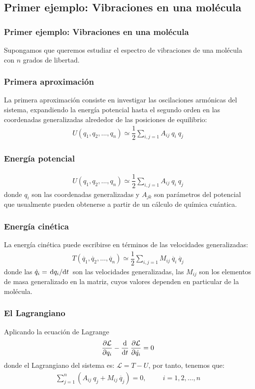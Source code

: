 \subsection{Primer ejemplo: Vibraciones en una molécula}
\begin{frame}
\frametitle{Primer ejemplo: Vibraciones en una molécula}
Supongamos que queremos estudiar el espectro de vibraciones de una molécula con $n$ grados de libertad.
\end{frame}
\begin{frame}
\frametitle{Primera aproximación}
La primera aproximación consiste en investigar las oscilaciones armónicas del sistema, expandiendo la energía potencial hasta el segundo orden en las coordenadas generalizadas alrededor de las posiciones de equilibrio:
\pause
\begin{align*}
U(q_{1}, q_{2}, \ldots, q_{n}) \simeq \dfrac{1}{2} \sum_{i, j = 1} A_{i j} \: q_{i} \: q_{j}
\end{align*}
\end{frame}
\begin{frame}
\frametitle{Energía potencial}
\begin{align*}
U(q_{1}, q_{2}, \ldots, q_{n}) \simeq \dfrac{1}{2} \sum_{i, j = 1} A_{i j} \: q_{i} \: q_{j}
\end{align*}
donde $q_{i}$ son las coordenadas generalizadas y $A_{j k}$ son parámetros del potencial que usualmente pueden obtenerse a partir de un cálculo de química cuántica.
\end{frame}
\begin{frame}
\frametitle{Energía cinética}
La energía cinética puede escribirse en términos de las velocidades generalizadas:
\begin{align*}
T(\dot{q_{1}}, \dot{q_{2}}, \ldots, \dot{q_{n}}) \simeq \dfrac{1}{2} \sum_{i, j=1} M_{i j} \: \dot{q_{i}} \: \dot{q_{j}}
\end{align*}
donde las $\dot{q}_{i}= \dv*{q_{i}}{t}$ son las velocidades generalizadas, las $M_{i j}$ son los elementos de masa generalizado en la matriz, cuyos valores dependen en particular de la molécula. 
\end{frame}
\begin{frame}
\frametitle{El Lagrangiano}
Aplicando la ecuación de Lagrange
\begin{align*}
\pdv{\mathcal{L}}{q_i} - \dv{t} \: \pdv{\mathcal{L}}{\dot{q_{i}}} = 0
\end{align*}
donde el Lagrangiano del sistema es: $\mathcal{L} = T - U$, por tanto, tenemos que:
\begin{align*}
\sum_{j = 1}^{n} \left( A_{ij} \: q_{j} + M_{ij} \: \ddot{q_{j}} \right) = 0, \hspace{1cm} i = 1, 2, \ldots, n
\end{align*}
\end{frame}
